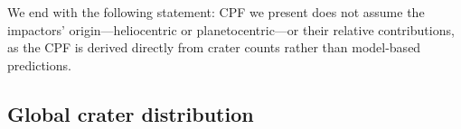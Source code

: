 \documentclass[preprint,11pt,3p,times,authoryear]{elsarticle}
\begin{document}
{We end with the following statement: CPF we present does not assume the impactors' origin—heliocentric or planetocentric—or their relative contributions, as the CPF is derived directly from crater counts rather than model-based predictions.




\subsection{Global crater distribution}
\label{subsec:crater_dist}

}
\end{document}
